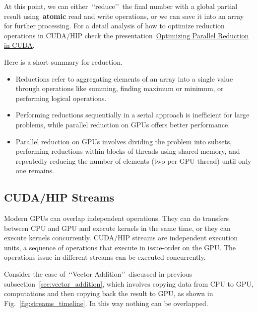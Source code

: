 \par
At this point, we can either~\lq\lq reduce\rq\rq~the final number with a global partial result using~\textbf{atomic} read and write operations, or we can save it into an array for further processing.
For a detail analysis of how to optimize reduction operations in CUDA/HIP check the presentation~\href{https://developer.download.nvidia.com/assets/cuda/files/reduction.pdf}{Optimizing Parallel Reduction in CUDA}.


\par
Here is a short summary for reduction.
\begin{itemize}
    \item Reductions refer to aggregating elements of an array into a single value through operations like summing, finding maximum or minimum, or performing logical operations.
    \item Performing reductions sequentially in a serial approach is inefficient for large problems, while parallel reduction on GPUs offers better performance.
    \item Parallel reduction on GPUs involves dividing the problem into subsets, performing reductions within blocks of threads using shared memory, and repeatedly reducing the number of elements (two per GPU thread) until only one remains.
\end{itemize}




\subsection{CUDA/HIP Streams}


\par
Modern GPUs can overlap independent operations.
They can do transfers between CPU and GPU and execute kernels in the same time, or they can execute kernels concurrently.
CUDA/HIP streams are independent execution units, a sequence of operations that execute in issue-order on the GPU.
The operations issue in different streams can be executed concurrently.


\par
Consider the case of~\lq\lq Vector Addition\rq\rq~discussed in previous subsection~\ref{sec:vector_addition}, which involves copying data from CPU to GPU, computations and then copying back the result to GPU, as shown in Fig.~\ref{fig:streams_timeline}.
In this way nothing can be overlapped.


